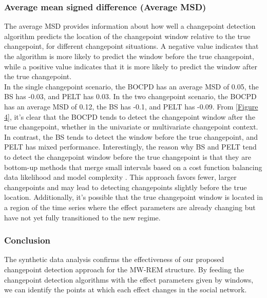 \documentclass[]{interact}
\theoremstyle{plain}%
\theoremstyle{definition}
\theoremstyle{remark}
\begin{document}
{    \subsubsection{Average mean signed difference (Average MSD)}
    
    \hspace{0.28cm} The average MSD provides information about how well a changepoint detection algorithm predicts the location of the changepoint window relative to the true changepoint, for different changepoint situations. A negative value indicates that the algorithm is more likely to predict the window before the true changepoint, while a positive value indicates that it is more likely to predict the window after the true changepoint. \\
    
    In the single changepoint scenario, the BOCPD has an average MSD of 0.05, the BS has -0.03, and PELT has 0.03. In the two changepoint scenario, the BOCPD has an average MSD of 0.12, the BS has -0.1, and PELT has -0.09. From \autoref{Figure 4}, it's clear that the BOCPD tends to detect the changepoint window after the true changepoint, whether in the univariate or multivariate changepoint context. In contrast, the BS tends to detect the window before the true changepoint, and PELT has mixed performance. Interestingly, the reason why BS and PELT tend to detect the changepoint window before the true changepoint is that they are bottom-up methods that merge small intervals based on a cost function balancing data likelihood and model complexity \cite{killickOptimalDetectionChangepoints2012}. This approach favors fewer, larger changepoints and may lead to detecting changepoints slightly before the true location. Additionally, it's possible that the true changepoint window is located in a region of the time series where the effect parameters are already changing but have not yet fully transitioned to the new regime.

    \subsubsection{Conclusion}

    \hspace{0.28cm} The synthetic data analysis confirms the effectiveness of our proposed changepoint detection approach for the MW-REM structure. By feeding the changepoint detection algorithms with the effect parameters given by windows, we can identify the points at which each effect changes in the social network. \\
    
}
\end{document}
